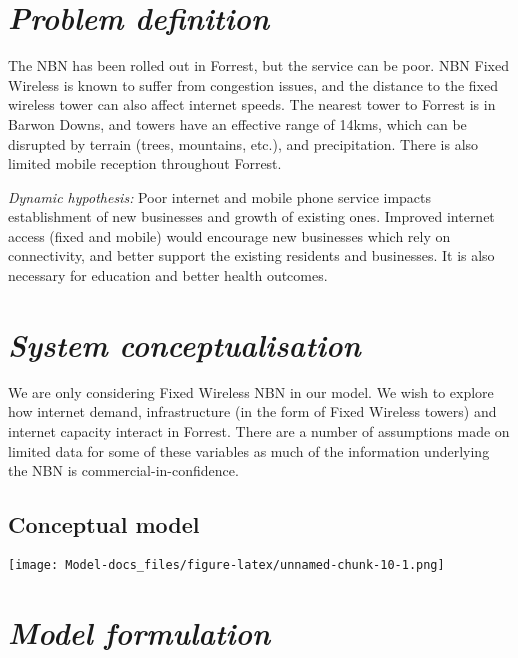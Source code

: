 \documentclass[
  11pt,
]{book}
\begin{document}
\hypertarget{problem-definition-9}{%
\section{\texorpdfstring{\emph{Problem definition}}{Problem definition}}\label{problem-definition-9}}

The NBN has been rolled out in Forrest, but the service can be poor. NBN Fixed Wireless is known to suffer from congestion issues, and the distance to the fixed wireless tower can also affect internet speeds. The nearest tower to Forrest is in Barwon Downs, and towers have an effective range of 14kms, which can be disrupted by terrain (trees, mountains, etc.), and precipitation. There is also limited mobile reception throughout Forrest.

\emph{Dynamic hypothesis:} Poor internet and mobile phone service impacts establishment of new businesses and growth of existing ones. Improved internet access (fixed and mobile) would encourage new businesses which rely on connectivity, and better support the existing residents and businesses. It is also necessary for education and better health outcomes.

\hypertarget{system-conceptualisation-5}{%
\section{\texorpdfstring{\emph{System conceptualisation}}{System conceptualisation}}\label{system-conceptualisation-5}}

We are only considering Fixed Wireless NBN in our model. We wish to explore how internet demand, infrastructure (in the form of Fixed Wireless towers) and internet capacity interact in Forrest. There are a number of assumptions made on limited data for some of these variables as much of the information underlying the NBN is commercial-in-confidence.

\hypertarget{conceptual-model-7}{%
\subsection{Conceptual model}\label{conceptual-model-7}}

\texttt{[image: Model-docs\_files/figure-latex/unnamed-chunk-10-1.png]}

\hypertarget{model-formulation-5}{%
\section{\texorpdfstring{\emph{Model formulation}}{Model formulation}}\label{model-formulation-5}}
\end{document}
